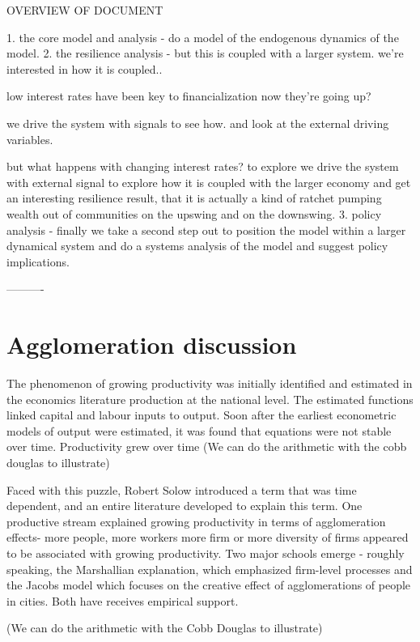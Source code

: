 OVERVIEW OF DOCUMENT

1. the core model and analysis - do a model of the endogenous dynamics of the model.
2. the resilience analysis -
but this is coupled with a larger system. we're interested in how it is coupled..

low interest rates have been key to financialization 
now they're going up?

we drive the system with signals to see how. and look at the external driving variables.

but what happens with changing interest rates? to explore we drive the system with external signal to explore how it is coupled with the larger economy and get an interesting resilience result, that it is actually a kind of ratchet pumping wealth out of communities on the upswing and on the downswing.
3.  policy analysis - finally we take a second step out to position the model within a larger dynamical system and do a systems analysis of the model and suggest policy implications. 

----------


\section{Agglomeration discussion}

The phenomenon of growing productivity was initially identified and estimated in the economics literature production at the national level. The estimated functions linked capital and labour inputs to output.  Soon after the  earliest econometric models of output  were estimated, it was found that equations were not stable over time. Productivity grew over time
(We can do the arithmetic with the cobb douglas to illustrate) 

Faced with this puzzle, Robert Solow introduced a term that was time dependent, and an entire literature developed to explain this term. One productive stream explained growing productivity in terms of agglomeration effects- more people, more workers more firm or more diversity of firms appeared to be associated with growing productivity. Two major schools emerge - roughly speaking,  the Marshallian explanation, which emphasized firm-level processes and the Jacobs model which focuses on the creative effect of agglomerations of people in cities. Both have receives empirical support.

(We can do the arithmetic with the Cobb Douglas to illustrate)


